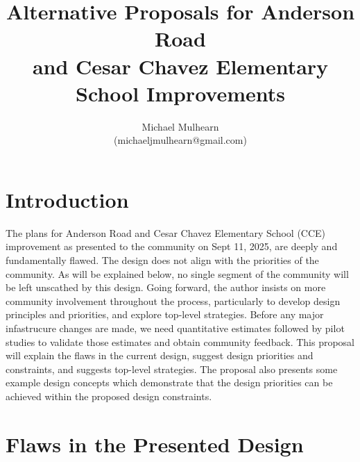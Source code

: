 \documentclass[12pt]{article}
\begin{document}


\title{Alternative Proposals for Anderson Road \\
  and Cesar Chavez Elementary School Improvements}
\author{Michael Mulhearn \\
(michaeljmulhearn@gmail.com)}

\maketitle

\section{Introduction}

The plans for Anderson Road and Cesar Chavez Elementary School (CCE)
improvement as presented to the community on Sept 11, 2025, are deeply
and fundamentally flawed.  The design does not align with the
priorities of the community.  As will be explained below, no single
segment of the community will be left unscathed by this design.  Going
forward, the author insists on more community involvement throughout
the process, particularly to develop design principles and priorities,
and explore top-level strategies.  Before any major infastrucure
changes are made, we need quantitative estimates followed by pilot
studies to validate those estimates and obtain community feedback.
This proposal will explain the flaws in the current design, suggest
design priorities and constraints, and suggests top-level strategies.
The proposal also presents some example design concepts which
demonstrate that the design priorities can be achieved within the
proposed design constraints.

\section{Flaws in the Presented Design}
\end{document}

